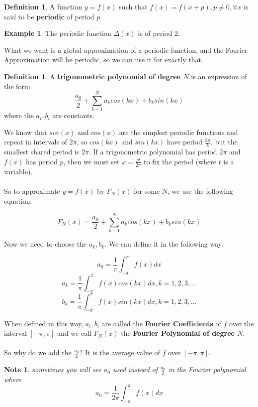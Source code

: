 \documentclass[12pt]{article}
\theoremstyle{plain}
\newtheorem*{note}{Note}
\theoremstyle{definition}
\newtheorem{definition}[theorem]{Definition}
\newtheorem{example}[theorem]{Example}
\begin{document}
\begin{definition}
	A function $y=f(x)$ such that $f(x)=f(x+p), p \neq 0, \forall x$ is said to be \textbf{periodic} of period $p$
\end{definition}

\begin{example}
	The periodic function $\Delta (x)$ is of period 2.
\end{example}

What we want is a global approximation of a periodic function, and the Fourier Approximation will be periodic, so we can use it for exactly that.

\begin{definition}
	A \textbf{trigonometric polynomial of degree $N$} is an expression of the form
	$$\frac{a_0}{2}+ \sum^N_{k-1} a_k cos(kx) + b_k sin(kx)$$ where the $a_i, b_i$ are constants.
\end{definition}

We know that $sin(x)$ and $cos(x)$ are the simplest periodic functions and repeat in intervals of $2\pi$, so $cos(kx)$ and $sin(kx)$ have period $\frac{2\pi}{k}$, but the smallest shared period is $2\pi$. If a trigonometric polynomial has period $2\pi$ and $f(x)$ has period $p$, then we must set $x=\frac{pt}{2\pi}$ to fix the period (where $t$ is a variable).\\
\\
So to approximate $y=f(x)$ by $F_N (x)$ for some $N$, we use the following equation:

$$F_N (x) = \frac{a_0}{2}+ \sum^N_{k-1} a_k cos(kx) + b_k sin(kx)$$

Now we need to choose the $a_k, b_k$. We can define it in the following way:

$$a_0 = \frac{1}{\pi} \int^{\pi}_{-\pi} f(x) dx$$
$$a_k = \frac{1}{\pi} \int^{\pi}_{-\pi} f(x) cos(kx) dx, k=1,2,3,...$$
$$b_k = \frac{1}{\pi} \int^{\pi}_{-\pi} f(x) sin(kx) dx, k=1,2,3,...$$

When defined in this way, $a_i, b_i$ are called the \textbf{Fourier Coefficients} of $f$ over the interval $[-\pi, \pi]$ and we call $F_N (x)$ the \textbf{Fourier Polynomial of degree $N$}.\\
\\
So why do we add the $\frac{a_0}{2}$? It is the average value of $f$ over $[-\pi, \pi]$.

\begin{note}
	sometimes you will see $a_0$ used instead of $\frac{a_0}{2}$ in the Fourier polynomial where $$a_0 = \frac{1}{2\pi} \int^{\pi}_{-\pi} f(x) dx$$
\end{note}
\end{document}
